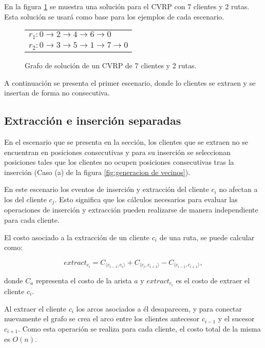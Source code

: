 \documentclass[12pt]{report}
\begin{document}
En la figura \ref{fig:Scenaries solution} se muestra una solución para el CVRP con 7 clientes y 2 rutas. Esta solución se usará como base para los ejemplos de cada escenario.

	\begin{figure}[!h]
		\centering
		\begin{tabular}{l}
			$r_1:0 \rightarrow 2 \rightarrow 4 \rightarrow 6 \rightarrow 0$ \\
			$r_2:0 \rightarrow 3 \rightarrow 5 \rightarrow 1 \rightarrow 7 \rightarrow 0$ \\
		\end{tabular}
		\caption{Grafo de solución de un CVRP de 7 clientes y 2 rutas.}
		\label{fig:Scenaries solution}
              \end{figure}

 	A continuación se presenta el primer escenario, donde lo clientes se extraen y se insertan de forma no consecutiva.

	\subsection{Extracción e inserción separadas}
	\label{sec:Extraccion e insercion separadas}

	En el escenario que se presenta en la sección, los clientes que se extraen no se encuentran en posiciones consecutivas y para su inserción se seleccionan posiciones tales que los clientes no ocupen posiciones consecutivas tras la inserción (Caso (a) de la figura \ref{fig:generacion de vecinos}).

	En este escenario los eventos de inserción y extracción del cliente $c_i$ no afectan a los del cliente $c_j$. Esto significa que los cálculos necesarios para evaluar las operaciones de inserción y extracción pueden realizarse de manera independiente para cada cliente.

	El costo asociado a la extracción de un cliente $c_i$ de una ruta, se puede calcular como:

	\begin{equation}
		extract_{c_i} =  C_{\langle c_{i-1},c_i \rangle} + C_{\langle c_i,c_{i+1} \rangle} - C_{\langle c_{i-1}, c_{i+1} \rangle},
		\label{eq:Extract-1-client}
	\end{equation}


	donde $C_a$ representa el costo de la arista $a$ y $extract_{c_i}$ es el costo de extraer el cliente $c_i$.

        Al extraer el cliente $c_i$ los arcos asociados a él desaparecen, y para conectar nuevamente el grafo se crea el arco entre los clientes antecesor $c_{i-1}$ y el sucesor $c_{i+1}$. Como esta operación se realiza para cada cliente, el costo total de la misma es $O(n)$.
\end{document}
